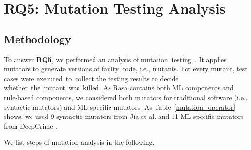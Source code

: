 
\section{RQ5: Mutation Testing Analysis}
\vspace{-3pt}
\subsection{Methodology}

To answer \textbf{RQ5}, we performed an analysis of mutation~testing~\cite{mutation_survey}. 
It applies mutators to generate versions of faulty~code, i.e., mutants. For every mutant, test cases were executed~to~collect the testing results to decide whether~the~mutant~was~killed. %
As Rasa contains both ML components and rule-based components, we considered both mutators for traditional software (i.e., syntactic mutators) and ML-specific mutators.
As Table~\ref{mutation_operator} shows, we used 9 syntactic mutators from Jia et al. \cite{JiaMutation} and 11 ML specific mutators from DeepCrime \cite{DeepCrime}. 

We list steps of mutation analysis in the following.

